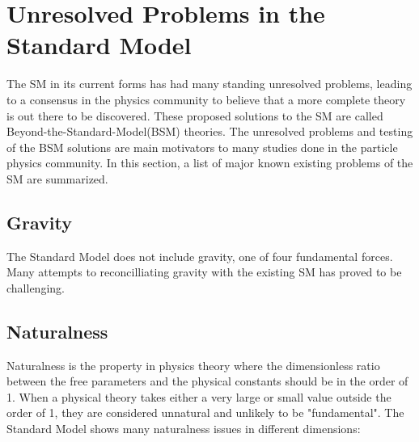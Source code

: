 


\section{Unresolved Problems in the Standard Model}
\label{sec:UnresolvedSM}
The SM in its current forms has had many standing unresolved problems, leading to a consensus in the physics community to believe that a more complete theory is out there to be discovered. These proposed solutions to the SM are called Beyond-the-Standard-Model(BSM) theories. The unresolved problems and testing of the BSM solutions are main motivators to many studies done in the particle physics community. In this section, a list of major known existing problems of the SM are summarized.

\subsection{Gravity}
The Standard Model does not include gravity, one of four fundamental forces. Many attempts to reconcilliating gravity with the existing SM has proved to be challenging\cite{sep-quantum-gravity}.

\subsection{Naturalness}
Naturalness is the property in physics theory where the dimensionless ratio between the free parameters and the physical constants should be in the order of 1. When a physical theory takes either a very large or small value outside the order of 1, they are considered unnatural and unlikely to be "fundamental". 
The Standard Model shows many naturalness issues in different dimensions: 

